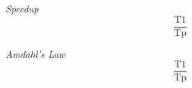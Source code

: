 \documentclass{article}
\begin{document}
\begin{enumerate}
\begin{item}
    \emph{Speedup} 
    \begin{equation*}
    \frac{\mathrm{T1}}{\mathrm{Tp}}
    \end{equation*}
    \begin{center}\end{center}
\end{item}
\begin{item}
    \emph{Amdahl's Law} 
    \begin{equation*}
    \frac{\mathrm{T1}}{\mathrm{Tp}}
    \end{equation*}
\end{item}
\end{enumerate}
\end{document}
